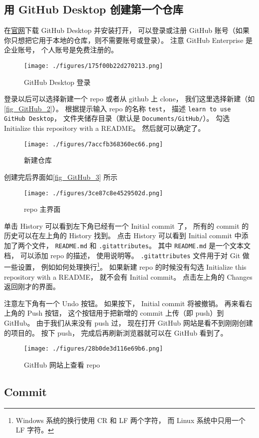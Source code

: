 \subsection{用 GitHub Desktop 创建第一个仓库}
在\href{https://desktop.github.com/}{官网}下载 GitHub Desktop 并安装打开， 可以登录或注册 GitHub 账号（如果你只想把它用于本地的仓库，则不需要账号或登录）。 注意 GitHub Enterprise 是企业账号， 个人账号是免费注册的。 %

\begin{figure}[ht]
\centering
\texttt{[image: ./figures/175f00b22d270213.png]}
\caption{GitHub Desktop 登录} \label{fig_GitHub_1}
\end{figure}

登录以后可以选择新建一个 repo 或者从 github 上 clone， 我们这里选择新建（如\autoref{fig_GitHub_2}）。 根据提示输入 repo 的名称 \verb|test|， 描述 \verb|learn to use GitHub Desktop|， 文件夹储存目录（默认是 \verb|Documents/GitHub/|）。 勾选 Initialize this repository with a README。 然后就可以确定了。

\begin{figure}[ht]
\centering
\texttt{[image: ./figures/7accfb368360ec66.png]}
\caption{新建仓库} \label{fig_GitHub_2}
\end{figure}

创建完后界面如\autoref{fig_GitHub_3} 所示
\begin{figure}[ht]
\centering
\texttt{[image: ./figures/3ce87c8e4529502d.png]}
\caption{repo 主界面} \label{fig_GitHub_3}
\end{figure}

单击 History 可以看到左下角已经有一个 Initial commit 了， 所有的 commit 的历史可以在左上角的 History 找到。 点击 History 可以看到 Initial commit 中添加了两个文件， \verb|README.md| 和 \verb|.gitattributes|。 其中 \verb|README.md| 是一个文本文档， 可以添加 repo 的描述， 使用说明等。 \verb|.gitattributes| 文件用于对 Git 做一些设置， 例如如何处理换行\footnote{Windows 系统的换行使用 CR 和 LF 两个字符， 而 Linux 系统中只用一个 LF 字符。}。 如果新建 repo 的时候没有勾选 Initialize this repository with a README， 就不会有 Initial commit。 点击左上角的 Changes 返回刚才的界面。

注意左下角有一个 Undo 按钮。 如果按下， Initial commit 将被撤销。 再来看右上角的 Push 按钮， 这个按钮用于把新增的 commit 上传（即 push）到 GitHub。 由于我们从来没有 push 过， 现在打开 GitHub 网站是看不到刚刚创建的项目的。 按下 push， 完成后再刷新浏览器就可以在 GitHub 看到了。
\begin{figure}[ht]
\centering
\texttt{[image: ./figures/28b0de3d116e69b6.png]}
\caption{GitHub 网站上查看 repo} \label{fig_GitHub_5}
\end{figure}

\subsection{Commit}
